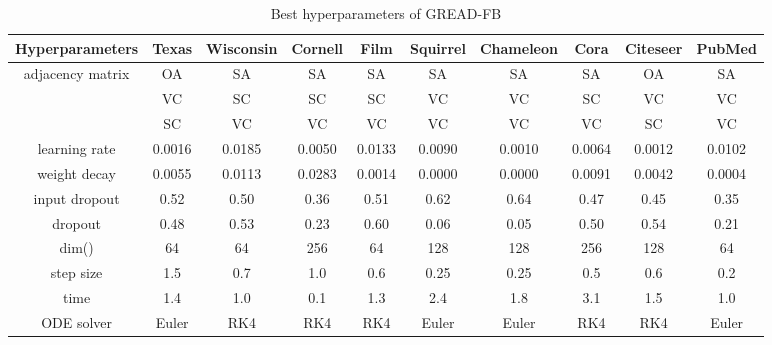 \documentclass{article}
\theoremstyle{plain}
\theoremstyle{definition}
\theoremstyle{remark}
\begin{document}
\begin{table*}[ht!]
    \centering
    \small
    \caption{Best hyperparameters of GREAD-FB}
    \label{tab:best_FB}
    \begin{tabular}{c ccccccccc} \toprule
        Hyperparameters  & Texas  & Wisconsin 
                                          & Cornell& Film   & Squirrel 
                                                                      & Chameleon
                                                                               & Cora   & Citeseer 
                                                                                                 & PubMed\\ \midrule
        adjacency matrix & OA     & SA     & SA     & SA     & SA     & SA     & SA     & OA     & SA    \\
                 & VC     & SC     & SC     & SC     & VC     & VC     & SC     & VC     & VC    \\
                  & SC     & VC     & VC     & VC     & VC     & VC     & VC     & SC     & VC    \\
        learning rate    & 0.0016 & 0.0185 & 0.0050 & 0.0133 & 0.0090 & 0.0010 & 0.0064 & 0.0012 & 0.0102\\
        weight decay     & 0.0055 & 0.0113 & 0.0283 & 0.0014 & 0.0000 & 0.0000 & 0.0091 & 0.0042 & 0.0004\\
        input dropout    & 0.52   & 0.50   & 0.36   & 0.51   & 0.62   & 0.64   & 0.47   & 0.45   & 0.35\\
        dropout          & 0.48   & 0.53   & 0.23   & 0.60   & 0.06   & 0.05   & 0.50   & 0.54   & 0.21\\
        dim()& 64     & 64     & 256    & 64     & 128    & 128    & 256    & 128    & 64\\
        step size  & 1.5    & 0.7    & 1.0    & 0.6    & 0.25   & 0.25   & 0.5    & 0.6    & 0.2\\
        time          & 1.4    & 1.0    & 0.1    & 1.3    & 2.4    & 1.8    & 3.1    & 1.5    & 1.0\\
        ODE solver       & Euler  & RK4    & RK4    & RK4    & Euler  & Euler  & RK4    & RK4    & Euler  \\
        \bottomrule
    \end{tabular}
\end{table*}
\end{document}
